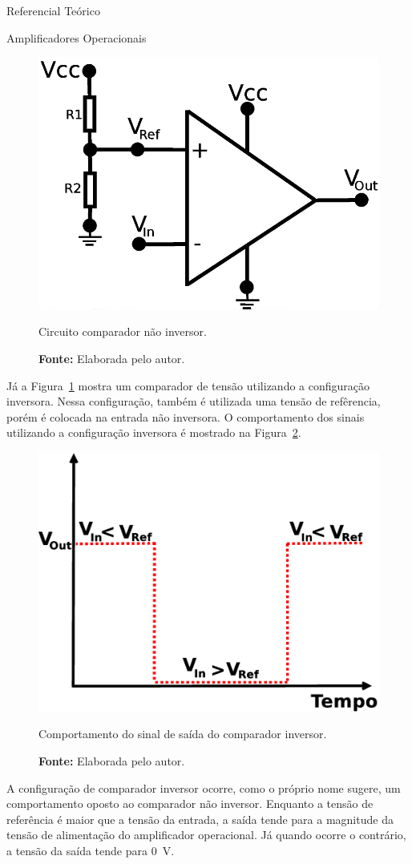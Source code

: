 \begin{chapter}{Referencial Teórico}
\begin{section}{Amplificadores Operacionais}
\begin{figure}[!h]
	\centering
	\begin{minipage}[c]{\textwidth}
	\centering
	\includegraphics[width=0.5\linewidth]{fig/inversor}
	\caption{Circuito comparador não inversor.}
	\vspace{-1cm}
	\caption*{\textbf{Fonte: }Elaborada pelo autor.}
	\label{fig:comparador2}
	\end{minipage}
\end{figure}
\break
Já a Figura~\ref{fig:comparador2} mostra um comparador de tensão utilizando a
configuração inversora. Nessa configuração, também é utilizada uma tensão de
refêrencia, porém é colocada na entrada não inversora. O comportamento dos sinais
utilizando a configuração inversora é mostrado na Figura~\ref{fig:sinal2}. 


\begin{figure}[!h]
	\centering
	\begin{minipage}[c]{\textwidth}
	\centering
	\includegraphics[width=0.55\linewidth]{fig/comparador_inversor}
	\caption{Comportamento do sinal de saída do comparador inversor.}
	\vspace{-1cm}
	\caption*{\textbf{Fonte: }Elaborada pelo autor.}
	\label{fig:sinal2}
	\end{minipage}
\end{figure}

A configuração de comparador inversor ocorre, como o próprio nome sugere, um
comportamento oposto ao comparador não inversor. Enquanto a tensão de referência
é maior que a tensão da entrada, a saída tende para a magnitude da tensão de
alimentação do amplificador operacional. Já quando ocorre o contrário,  a tensão
da saída tende para 0~V.


\end{section}
\end{chapter}
